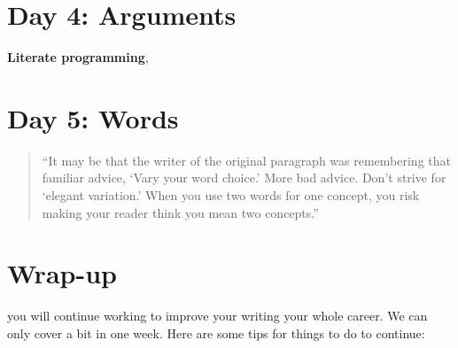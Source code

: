 \documentclass[]{tufte-book}
\begin{document}
\hypertarget{day-4-arguments}{%
\chapter{Day 4: Arguments}\label{day-4-arguments}}

\textbf{Literate programming},

\hypertarget{day-5-words}{%
\chapter{Day 5: Words}\label{day-5-words}}


\begin{quote}
``It may be that the writer of the original paragraph was remembering that
familiar advice, `Vary your word choice.' More bad advice. Don't strive for
`elegant variation.' When you use two words for one concept, you risk making
your reader think you mean two concepts.''
\end{quote}

\hypertarget{wrap-up}{%
\chapter{Wrap-up}\label{wrap-up}}

 you will continue working to improve your
writing your whole career. We can only cover a bit in one week. Here are some tips for
things to do to continue:
\end{document}
